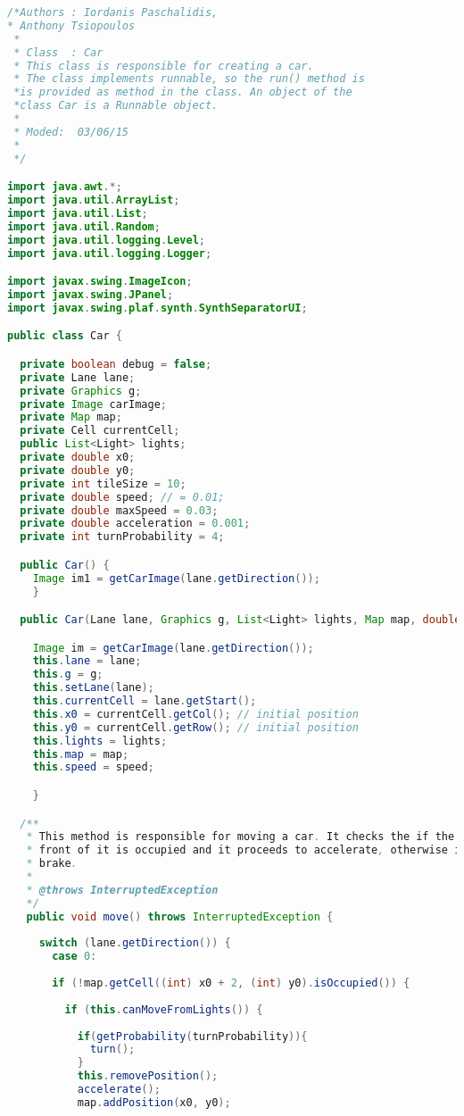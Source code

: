 \begin{lstlisting}[language=java]
/*Authors : Iordanis Paschalidis, 
* Anthony Tsiopoulos 
 * 
 * Class  : Car
 * This class is responsible for creating a car.
 * The class implements runnable, so the run() method is
 *is provided as method in the class. An object of the 
 *class Car is a Runnable object.   
 * 
 * Moded:  03/06/15
 * 
 */

import java.awt.*;
import java.util.ArrayList;
import java.util.List;
import java.util.Random;
import java.util.logging.Level;
import java.util.logging.Logger;

import javax.swing.ImageIcon;
import javax.swing.JPanel;
import javax.swing.plaf.synth.SynthSeparatorUI;

public class Car {

  private boolean debug = false;
  private Lane lane;
  private Graphics g;
  private Image carImage;
  private Map map;
  private Cell currentCell;
  public List<Light> lights;
  private double x0;
  private double y0;
  private int tileSize = 10;
  private double speed; // = 0.01;
  private double maxSpeed = 0.03;
  private double acceleration = 0.001;
  private int turnProbability = 4; 

  public Car() {
    Image im1 = getCarImage(lane.getDirection());
    }

  public Car(Lane lane, Graphics g, List<Light> lights, Map map, double speed) {

    Image im = getCarImage(lane.getDirection());
    this.lane = lane;
    this.g = g;
    this.setLane(lane);
    this.currentCell = lane.getStart();
    this.x0 = currentCell.getCol(); // initial position
    this.y0 = currentCell.getRow(); // initial position
    this.lights = lights;
    this.map = map;
    this.speed = speed; 

    }

  /**
   * This method is responsible for moving a car. It checks the if the cell in
   * front of it is occupied and it proceeds to accelerate, otherwise it will
   * brake.
   * 
   * @throws InterruptedException
   */
   public void move() throws InterruptedException {
     
     switch (lane.getDirection()) {
       case 0:
       
       if (!map.getCell((int) x0 + 2, (int) y0).isOccupied()) {
         
         if (this.canMoveFromLights()) {
           
           if(getProbability(turnProbability)){
             turn();
           }
           this.removePosition();
           accelerate();
           map.addPosition(x0, y0);
           

\end{lstlisting}

